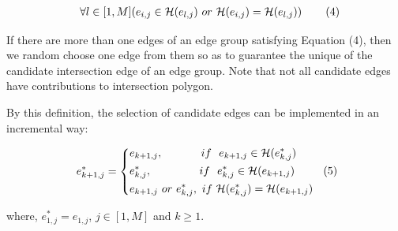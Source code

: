 \vspace{-2ex}
\begin{equation*}
\label{equ-inter-edge-full}
    \begin{aligned}
        \hspace{2ex}  \forall l \in [1, M] (e_{i,j} \in \mathcal{H}(e_{l,j}) ~or~ \mathcal{H}(e_{i,j}) = \mathcal{H}(e_{l,j}) )    \hspace{5ex} (4)\\
    \end{aligned}
\end{equation*}
\vspace{-2ex}


If there are more than one edges of an edge group satisfying Equation (4), then we random choose one edge from them so as to guarantee the unique of the candidate intersection edge of an edge group. Note that not all candidate edges have contributions to intersection polygon.


By this definition, the selection of candidate edges can be implemented in an incremental way:

\vspace{-2ex}
\begin{equation*}
\label{equ-inter-edge-it}
    \begin{aligned}
        \hspace{1ex}  e^*_{k+1, j} = \left\{
            \begin{aligned}
                & e_{k+1, j},   \hspace{8ex}if~~ e_{k+1,j} \in \mathcal{H}(e^*_{k,j}) \\
                & e^*_{k, j},   \hspace{10ex}if~~ e^*_{k,j} \in \mathcal{H}(e_{k+1,j})      \hspace{6ex} (5)  \\
                & e_{k+1, j} ~or~ e^*_{k, j}, ~if~ \mathcal{H}(e^*_{k,j}) = \mathcal{H}(e_{k+1,j}) \\
            \end{aligned}
        \right.
    \end{aligned}
\end{equation*}
\vspace{-1ex}

where,  $e^*_{1, j} = e_{1, j}$, $j \in [1, M]$ and $k\ge 1$.



